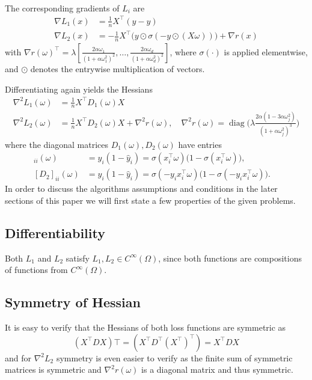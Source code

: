 \documentclass{article}
\begin{document}
\\
The corresponding gradients of $L_i$ are
\begin{align}
\nabla L_1(x) &= \frac{1}{n} X^\top (\hat{y} - y) \\
\nabla L_2(x) &= -\frac{1}{n} X^\top \big(y \odot \sigma(-y \odot (X\omega))\big) + \nabla r(x)
\end{align}
with $\nabla r(\omega)^\top = \lambda \left[ \frac{2\alpha \omega_1}{(1 + \alpha \omega_1^2)^2}, \ldots, \frac{2\alpha \omega_d}{(1 + \alpha \omega_d^2)^2} \right]$, where $\sigma(\cdot)$ is applied elementwise, and $\odot$ denotes the entrywise multiplication of vectors.


Differentiating again yields the Hessians
\begin{align}
\nabla^2 L_1(\omega) &= \frac{1}{n} X^\top D_1 (\omega) X\\
\nabla^2 L_2(\omega) &= \frac{1}{n} X^\top D_2(\omega) X + \nabla^2 r(\omega), \quad
\nabla ^2 r(\omega) = \operatorname{diag}\Big(\lambda \frac{2\alpha (1 - 3\alpha \omega_j^2)}{(1 + \alpha \omega_j^2)^3}\Big)
\end{align}
where the diagonal matrices  $D_1(\omega), D_2(\omega)$ have entries
\begin{align}
  [D_1]_{ii}(\omega) &= \hat{y}_i (1 - \hat{y}_i)=  \sigma( x_i^\top \omega) \big(1 - \sigma(x_i^\top \omega)\big),\quad\\
  [D_2]_{ii}(\omega) &= \hat{y}_i (1 - \hat{y}_i)=  \sigma(-y_i x_i^\top \omega) \big(1 - \sigma(-y_i x_i^\top \omega)\big).\quad 
\end{align}
In order to discuss the algorithms assumptions and conditions in the later sections of this paper we will first state a few properties of the given problems.
%
\subsection{Differentiability}
Both $L_1$ and $L_2$ satisfy $L_1, L_2 \in C ^\infty (\Omega)$, since both functions are compositions of functions from $C ^\infty (\Omega)$.
\subsection{Symmetry of Hessian}
It is easy to verify that the Hessians of both loss functions are symmetric as
$$ (X^\top D X) \top = (X^\top D^\top (X ^\top)^\top)  = X^\top D X$$
and for $\nabla^2 L_2 $ symmetry is even easier to verify as the finite sum of symmetric matrices is symmetric and $\nabla^2 r(\omega)$ is a diagonal matrix and thus symmetric.
\end{document}
